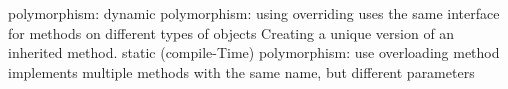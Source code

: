 
polymorphism:
  dynamic polymorphism:
    using overriding
    uses the same interface for methods on different types of objects
    Creating a unique version of an inherited method. 
  static (compile-Time) polymorphism:
    use overloading method
    implements multiple methods with the same name, but different parameters


